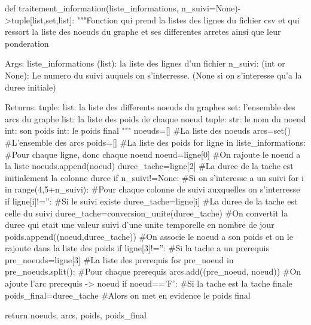 \documentclass{article}
\begin{document}
\begin{python}
def traitement_information(liste_informations, n_suivi=None)->tuple[list,set,list]:
    """Fonction qui prend la listes des lignes du fichier csv et qui ressort la liste des noeuds du graphe 
    et ses differentes arretes ainsi que leur ponderation

    Args:
        liste_informations (list): la liste des lignes d'un fichier
        n_suivi: (int or None): Le numero du suivi auquels on s'interresse. (None si on s'interesse qu'a la duree initiale)

    Returns:
        tuple: 
            list: la liste des differents noeuds du graphes 
            set: l'ensemble des arcs du graphe
            list: la liste des poids de chaque noeud
                tuple: 
                    str: le nom du noeud
                    int: son poids
            int: le poids final
    """
    noeuds=[] #La liste des noeuds
    arcs=set() #L'ensemble des arcs
    poids=[] #La liste des poids
    for ligne in liste_informations: #Pour chaque ligne, donc chaque noeud
        noeud=ligne[0] #On rajoute le noeud a la liste
        noeuds.append(noeud)
        duree_tache=ligne[2] #La duree de la tache est initialement la colonne duree
        if n_suivi!=None: #Si on s'interesse a un suivi
            for i in range(4,5+n_suivi): #Pour chaque colonne de suivi auxquelles on s'interresse
                if ligne[i]!='': #Si le suivi existe
                    duree_tache=ligne[i] #La duree de la tache est celle du suivi
        duree_tache=conversion_unite(duree_tache) #On convertit la duree qui etait une valeur suivi d'une unite temporelle en nombre de jour
        poids.append((noeud,duree_tache)) #On associe le noeud a son poids et on le rajoute dans la liste des poids
        if ligne[3]!='': #Si la tache a un prerequis
            pre_noeuds=ligne[3] #La liste des prerequis
            for pre_noeud in pre_noeuds.split(): #Pour chaque prerequis
                arcs.add((pre_noeud, noeud)) #On ajoute l'arc prerequis -> noeud
        if noeud=='F': #Si la tache est la tache finale
            poids_final=duree_tache #Alors on met en evidence le poids final
        
    return noeuds, arcs, poids, poids_final
\end{python}
\end{document}
